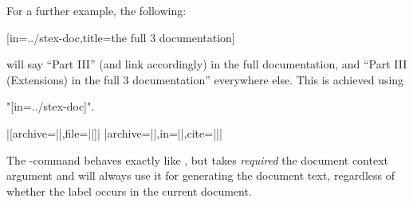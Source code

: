 For a further example, the following:
\begin{center}
    [in=../stex-doc,title={the full \sTeX{}3 documentation}]
\end{center}
will say ``Part III'' (and link accordingly) in the full documentation,
and ``Part III (Extensions) in the full \sTeX{}3 documentation''
everywhere else. This is achieved using

\stexcode"[in=../stex-doc]".

\begin{function}{\extref}
    \begin{syntax} |[archive=||,file=||]|%
        |{archive=||,in=||,cite=||}| \end{syntax}
    The -command behaves exactly like , but takes
    \emph{required} the document context argument and will always use it
    for generating the document text, regardless of whether the label
    occurs in the current document.
\end{function}


